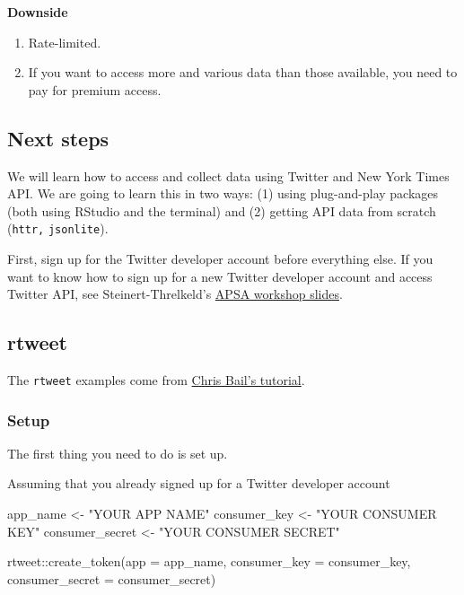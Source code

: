 \documentclass[
]{book}
\newenvironment{Shaded}{\begin{snugshade}}{\end{snugshade}}
\newcommand{\AttributeTok}[1]{\textcolor[rgb]{0.77,0.63,0.00}{#1}}
\newcommand{\FunctionTok}[1]{\textcolor[rgb]{0.00,0.00,0.00}{#1}}
\newcommand{\NormalTok}[1]{#1}
\newcommand{\OtherTok}[1]{\textcolor[rgb]{0.56,0.35,0.01}{#1}}
\newcommand{\SpecialCharTok}[1]{\textcolor[rgb]{0.00,0.00,0.00}{#1}}
\newcommand{\StringTok}[1]{\textcolor[rgb]{0.31,0.60,0.02}{#1}}
\begin{document}
\textbf{Downside}

\begin{enumerate}
\def\labelenumi{\arabic{enumi}.}
\item
  Rate-limited.
\item
  If you want to access more and various data than those available, you need to pay for premium access.
\end{enumerate}

\hypertarget{next-steps}{%
\subsection{Next steps}\label{next-steps}}

We will learn how to access and collect data using Twitter and New York Times API. We are going to learn this in two ways: (1) using plug-and-play packages (both using RStudio and the terminal) and (2) getting API data from scratch (\texttt{httr,} \texttt{jsonlite}).

First, sign up for the Twitter developer account before everything else. If you want to know how to sign up for a new Twitter developer account and access Twitter API, see Steinert-Threlkeld's \href{https://github.com/ZacharyST/APSA2020_EventDataFromSocialMedia/blob/master/Presentation/02_AccessTwitter.pdf}{APSA workshop slides}.

\hypertarget{rtweet}{%
\subsection{rtweet}\label{rtweet}}

The \texttt{rtweet} examples come from \href{https://cbail.github.io/SICSS_APIs_markdown.html}{Chris Bail's tutorial}.

\hypertarget{setup-5}{%
\subsubsection{Setup}\label{setup-5}}

The first thing you need to do is set up.

Assuming that you already signed up for a Twitter developer account

\begin{Shaded}
\begin{Highlighting}[]
\NormalTok{app\_name }\OtherTok{\textless{}{-}} \StringTok{"YOUR APP NAME"}
\NormalTok{consumer\_key }\OtherTok{\textless{}{-}} \StringTok{"YOUR CONSUMER KEY"}
\NormalTok{consumer\_secret }\OtherTok{\textless{}{-}} \StringTok{"YOUR CONSUMER SECRET"}

\NormalTok{rtweet}\SpecialCharTok{::}\FunctionTok{create\_token}\NormalTok{(}\AttributeTok{app =}\NormalTok{ app\_name, }
                     \AttributeTok{consumer\_key =}\NormalTok{ consumer\_key, }
                     \AttributeTok{consumer\_secret =}\NormalTok{ consumer\_secret)}
\end{Highlighting}
\end{Shaded}
\end{document}
